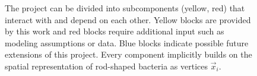 \documentclass{article}
\begin{document}

\begin{figure}
    \centering
    
    \caption{
        The project can be divided into subcomponents (yellow, red) that interact with and depend on
        each other.
        Yellow blocks are provided by this work and red blocks require additional input such as
        modeling assumptions or data.
        Blue blocks indicate possible future extensions of this project.
        Every component implicitly builds on the spatial representation of rod-shaped bacteria as
        vertices $\vec{x}_i$.
    }
    \label{fig:flowchart-project-structure}
\end{figure}
\end{document}
